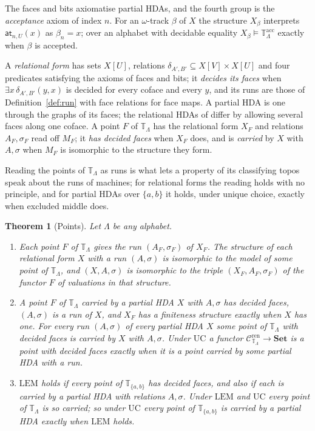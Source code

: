 \documentclass{lmcs}
\newtheorem{theorem}{Theorem}[section]
\theoremstyle{definition}
\theoremstyle{remark}
\newcommand{\Tt}{\mathbb{T}}
\newcommand{\Set}{\mathbf{Set}}
\newcommand{\ab}{\{a,b\}}
\newcommand{\prin}[1]{\mathrm{#1}}
\newcommand{\EM}{\prin{LEM}}
\newcommand{\UC}{\prin{UC}}
\newcommand{\TR}{\Tt_{\Lambda}}
\newcommand{\TRab}{\Tt_{\ab}}
\newcommand{\Csyn}[1]{\mathcal{C}^{\mathrm{ren}}_{#1}}
\newcommand{\MF}[1]{M_{#1}}
\newcommand{\XF}[1]{X_{#1}}
\providecommand{\Tacc}{\Tt^{\mathrm{acc}}_{\Lambda}}
\begin{document}
The faces and bits axiomatise partial HDAs, and the fourth group is the \emph{acceptance} axiom of index
$n$. For an $\omega$-track $\beta$ of $X$ the structure $X_\beta$ interprets $\mathsf{at}_{n,U}(x)$ as
$\beta_n=x$; over an alphabet with decidable equality $X_\beta\models\Tacc$ exactly
when $\beta$ is accepted.

A \emph{relational form} has sets $X[U]$, relations $\delta_{A',B'}\subseteq X[V]\times X[U]$ and four
predicates satisfying the axioms of faces and bits; it \emph{decides its faces} when $\exists x\,\delta_{A',B'}(y,x)$ is decided
for every coface and every $y$, and its runs are those of Definition~\ref{def:run} with face relations for face
maps.
A partial HDA is one through the graphs of its faces; the relational
HDAs of \cite{BDFZ26} differ by allowing several faces along one
coface. A point $F$ of $\TR$ has the relational form $\XF{F}$ and relations $A_F,\sigma_F$
read off $\MF{F}$; it \emph{has decided faces} when $\XF{F}$ does, and is \emph{carried} by $X$ with $A,\sigma$ when
$\MF{F}$ is isomorphic to the structure they
form.

Reading the points of $\TR$ as runs is what lets a property of its classifying topos speak about the runs of
machines; for relational forms the reading holds with no principle, and for partial HDAs over $\ab$ it holds, under
unique choice, exactly when excluded middle does.

\begin{theorem}[Points]\label{thm:points}\label{thm:decided}\label{thm:price-em}
Let $\Lambda$ be any alphabet.
\begin{enumerate}
\item Each point $F$ of $\TR$ gives the run $(A_F,\sigma_F)$ of $\XF{F}$. The
  structure of each relational form $X$ with a run $(A,\sigma)$ is isomorphic to the model of some point of
  $\TR$, and $(X,A,\sigma)$ is isomorphic to the triple
  $(\XF{F},A_F,\sigma_F)$ of the functor $F$ of valuations in that structure.
\item A point $F$ of $\TR$ carried by a partial HDA $X$ with $A,\sigma$ has decided
  faces, $(A,\sigma)$ is a run of $X$, and
  $\XF{F}$ has a finiteness structure exactly when $X$ has one. For every run
  $(A,\sigma)$ of every partial HDA $X$ some point of $\TR$ with decided faces is carried by $X$ with
  $A,\sigma$. Under $\UC$ a functor $\Csyn{\TR}\to\Set$ is a point with decided
  faces exactly when it is a point carried by some partial HDA with a
  run.
\item $\EM$ holds if every point of $\TRab$ has decided faces, and also if each
  is carried by a partial HDA with relations $A,\sigma$. Under $\EM$ and $\UC$ every point
  of $\TR$ is so carried; so under $\UC$ every point of $\TRab$ is carried by a
  partial HDA exactly when $\EM$ holds.
\end{enumerate}
\end{theorem}
\end{document}
